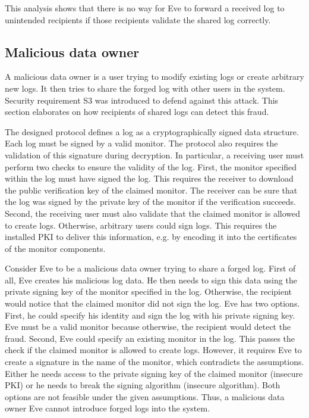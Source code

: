 \documentclass[../main.tex]{subfiles}
\begin{document}
This analysis shows that there is no way for Eve to forward a received log to unintended recipients if those recipients validate the shared log correctly.


\subsection{Malicious data owner}
A malicious data owner is a user trying to modify existing logs or create arbitrary new logs.
It then tries to share the forged log with other users in the system.
Security requirement S3 was introduced to defend against this attack.
This section elaborates on how recipients of shared logs can detect this fraud.

The designed protocol defines a log as a cryptographically signed data structure.
Each log must be signed by a valid monitor.
The protocol also requires the validation of this signature during decryption.
In particular, a receiving user must perform two checks to ensure the validity of the log.
First, the monitor specified within the log must have signed the log.
This requires the receiver to download the public verification key of the claimed monitor.
The receiver can be sure that the log was signed by the private key of the monitor if the verification succeeds.
Second, the receiving user must also validate that the claimed monitor is allowed to create logs.
Otherwise, arbitrary users could sign logs.
This requires the installed PKI to deliver this information, e.g. by encoding it into the certificates of the monitor components.

Consider Eve to be a malicious data owner trying to share a forged log.
First of all, Eve creates his malicious log data.
He then needs to sign this data using the private signing key of the monitor specified in the log.
Otherwise, the recipient would notice that the claimed monitor did not sign the log.
Eve has two options.
First, he could specify his identity and sign the log with his private signing key.
Eve must be a valid monitor because otherwise, the recipient would detect the fraud.
Second, Eve could specify an existing monitor in the log.
This passes the check if the claimed monitor is allowed to create logs.
However, it requires Eve to create a signature in the name of the monitor, which contradicts the assumptions.
Either he needs access to the private signing key of the claimed monitor (insecure PKI) or he needs to break the signing algorithm (insecure algorithm).
Both options are not feasible under the given assumptions.
Thus, a malicious data owner Eve cannot introduce forged logs into the system.
\end{document}

